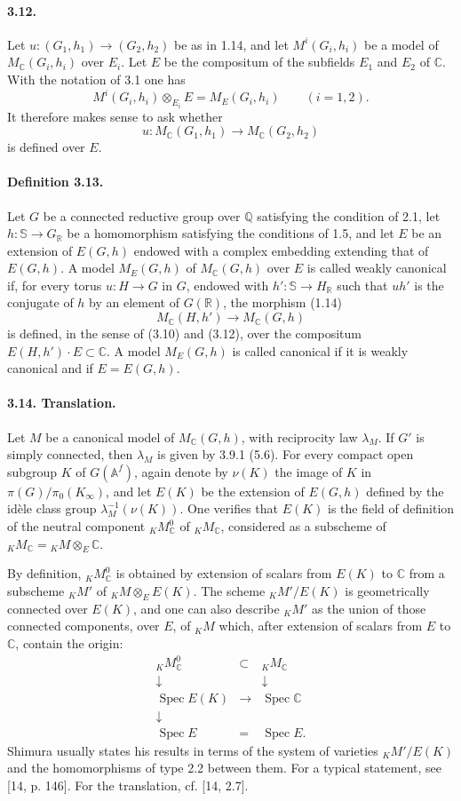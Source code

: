 \documentclass[10pt]{article}
\newcommand{\Af}{\mathbb A^f}
\newcommand{\C}{\mathbb C}
\newcommand{\Q}{\mathbb Q}
\newcommand{\R}{\mathbb R}
\newcommand{\bS}{\mathbb S}
\newcommand{\MC}{M_{\C}}
\newcommand{\Spec}{\operatorname{Spec}}
\begin{document}
\paragraph{3.12.} Let $u:(G_1,h_1)\to(G_2,h_2)$ be as in 1.14, and let $M^i(G_i,h_i)$ be a model of $\MC(G_i,h_i)$ over $E_i$. Let $E$ be the compositum of the subfields $E_1$ and $E_2$ of $\C$. With the notation of 3.1 one has
\[
M^i(G_i,h_i)\otimes_{E_i}E=M_E(G_i,h_i)\qquad(i=1,2).
\]
It therefore makes sense to ask whether
\[
u:\MC(G_1,h_1)\longrightarrow\MC(G_2,h_2)
\]
is defined over $E$.

\paragraph{Definition 3.13.} Let $G$ be a connected reductive group over $\Q$ satisfying the condition of 2.1, let $h:\bS\to G_\R$ be a homomorphism satisfying the conditions of 1.5, and let $E$ be an extension of $E(G,h)$ endowed with a complex embedding extending that of $E(G,h)$. A model $M_E(G,h)$ of $\MC(G,h)$ over $E$ is called weakly canonical if, for every torus $u:H\to G$ in $G$, endowed with $h':\bS\to H_\R$ such that $uh'$ is the conjugate of $h$ by an element of $G(\R)$, the morphism (1.14)
\[
\MC(H,h')\longrightarrow\MC(G,h)
\]
is defined, in the sense of (3.10) and (3.12), over the compositum $E(H,h')\cdot E\subset\C$. A model $M_E(G,h)$ is called canonical if it is weakly canonical and if $E=E(G,h)$.

\paragraph{3.14. Translation.} Let $M$ be a canonical model of $\MC(G,h)$, with reciprocity law $\lambda_M$. If $G'$ is simply connected, then $\lambda_M$ is given by 3.9.1 (5.6). For every compact open subgroup $K$ of $G(\Af)$, again denote by $\nu(K)$ the image of $K$ in $\pi(G)/\pi_0(K_\infty)$, and let $E(K)$ be the extension of $E(G,h)$ defined by the idèle class group $\lambda_M^{-1}(\nu(K))$. One verifies that $E(K)$ is the field of definition of the neutral component ${}_K\MC^0$ of ${}_K\MC$, considered as a subscheme of ${}_K\MC={}_K M\otimes_E\C$.

By definition, ${}_K\MC^0$ is obtained by extension of scalars from $E(K)$ to $\C$ from a subscheme ${}_K M'$ of ${}_K M\otimes_EE(K)$. The scheme ${}_K M'/E(K)$ is geometrically connected over $E(K)$, and one can also describe ${}_K M'$ as the union of those connected components, over $E$, of ${}_K M$ which, after extension of scalars from $E$ to $\C$, contain the origin:
\[
\begin{array}{ccc}
{}_K\MC^0&\subset&{}_K\MC\\
\downarrow&&\downarrow\\
\Spec E(K)&\longrightarrow&\Spec\C\\
\downarrow&&\\
\Spec E&=&\Spec E.
\end{array}
\]
Shimura usually states his results in terms of the system of varieties ${}_K M'/E(K)$ and the homomorphisms of type 2.2 between them. For a typical statement, see [14, p. 146]. For the translation, cf. [14, 2.7].
\end{document}
